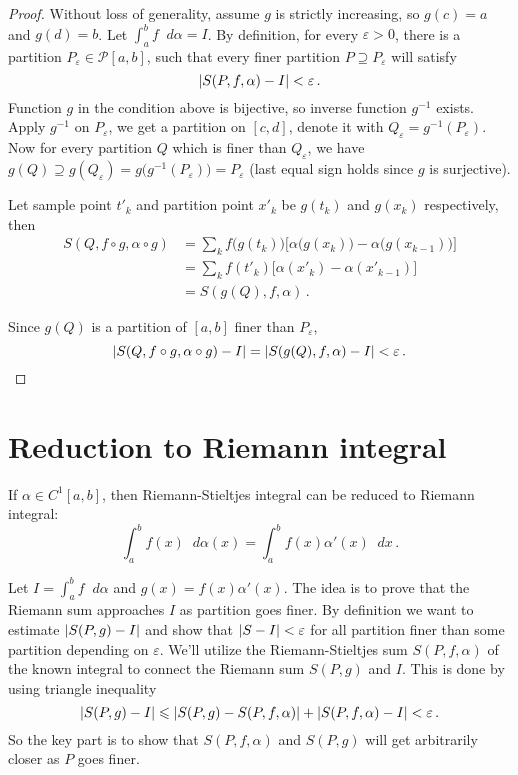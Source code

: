 \documentclass{article}
\newcommand{\Partition}{\mathcal P}
\DeclarePairedDelimiter\abs{\lvert}{\rvert}
\newcommand{\finer}{\supseteq}
\newcommand{\dd}{\mathop{}\!d}
\begin{document}
\begin{proof}
    
    Without loss of generality, assume $ g $ is strictly increasing, so $ g(c) = a $ and $ g(d) = b $. Let $ \int_a^b f \dd \alpha = I $. By definition, for every $ \varepsilon > 0 $, there is a partition $ P_\varepsilon \in \Partition[a, b] $, such that every finer partition $ P \finer P_\varepsilon $ will satisfy
    \[ 
        \abs{ S(P, f, \alpha) - I } < \varepsilon \,.
    \]
    Function $ g $ in the condition above is bijective, so inverse function $ g^{-1} $ exists. Apply $ g^{-1} $ on $ P_\varepsilon $, we get a partition on $ [c, d] $, denote it with $ Q_\varepsilon = g^{-1}(P_\varepsilon) $. Now for every partition $ Q $ which is finer than $ Q_\varepsilon $, we have $ g(Q) \supseteq g(Q_\varepsilon) = g \big( g^{-1} (P_\varepsilon) \big) = P_\varepsilon $ (last equal sign holds since $ g $ is surjective). 
    
    Let sample point $ t'_k $ and partition point $ x'_k $ be $ g(t_k) $ and $ g(x_k) $ respectively, then
    \begin{align*}
        S(Q, f \circ g, \alpha \circ g) &= \sum_k f \big( g(t_k) \big) \big[ \alpha \big( g(x_k) \big) - \alpha \big( g(x_{k-1}) \big) \big] \\
        &= \sum_k f(t'_k) \big[ \alpha(x'_k) - \alpha (x'_{k-1}) \big] \\
        &= S(g(Q), f, \alpha) \,.
    \end{align*}
    
    Since $ g(Q) $ is a partition of $ [a, b] $ finer than $ P_\varepsilon $,
    \[ 
        \abs{ S(Q, f \circ g, \alpha \circ g) - I } = \abs{ S(g(Q), f, \alpha) - I } < \varepsilon \,.
    \]
\end{proof}

\section{Reduction to Riemann integral}
\begin{theorem} \label{thm:reduction-1}
    If $ \alpha \in C^1[a, b] $, then Riemann-Stieltjes integral can be reduced to Riemann integral:
    \[ 
        \int_a^b f(x) \dd \alpha(x) = \int_a^b f(x) \alpha'(x) \dd x \,.
    \]
\end{theorem}

Let $ I = \int_a^b f \dd \alpha $ and $ g(x) = f(x) \alpha'(x) $. The idea is to prove that the Riemann sum approaches $ I $ as partition goes finer. By definition we want to estimate $ \abs{ S(P, g) - I } $ and show that $ \abs{ S - I } < \varepsilon $ for all partition finer than some partition depending on $ \varepsilon $. We'll utilize the Riemann-Stieltjes sum $ S(P, f, \alpha) $ of the known integral to connect the Riemann sum $ S(P, g) $ and $ I $. This is done by using triangle inequality 
\[ 
    \abs{ S(P, g) - I } \leqslant \abs{ S(P, g) - S(P, f, \alpha)} + \abs{ S(P, f, \alpha) - I } < \varepsilon \,. 
\]
So the key part is to show that $ S(P, f, \alpha) $ and $ S(P, g) $ will get arbitrarily closer as $ P $ goes finer.
\end{document}
